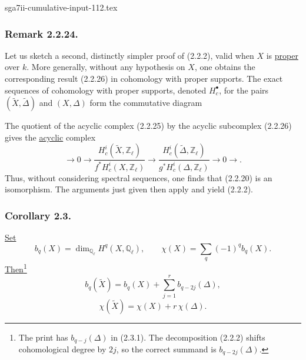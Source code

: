 \begin{filecontents*}{sga7ii-cumulative-input-112.tex}
\subsubsection*{Remark 2.2.24.}
Let us sketch a second, distinctly simpler proof of (2.2.2), valid when $X$
is \underline{proper} over $k$. More generally, without any hypothesis on
$X$, one obtains the corresponding result (2.2.26) in cohomology with proper
supports. The exact sequences of cohomology with proper supports, denoted
$H_c^\bullet$, for the pairs
$(\widetilde X,\widetilde\Delta)$ and $(X,\Delta)$ form the commutative
diagram
\begin{center}
\end{center}
The quotient of the acyclic complex (2.2.25) by the acyclic subcomplex
(2.2.26) gives the \underline{acyclic} complex
\begin{equation}\tag{2.2.27}
\longrightarrow 0\longrightarrow
\frac{H_c^i(\widetilde X,\mathbb Z_\ell)}
     {f^*H_c^i(X,\mathbb Z_\ell)}
\longrightarrow
\frac{H_c^i(\widetilde\Delta,\mathbb Z_\ell)}
     {g^*H_c^i(\Delta,\mathbb Z_\ell)}
\longrightarrow0\longrightarrow.
\end{equation}
Thus, without considering spectral sequences, one finds that (2.2.20) is an
isomorphism. The arguments just given then apply and yield (2.2.2).

\subsubsection*{Corollary 2.3.}
\underline{Set}
\[
b_q(X)=\dim_{\mathbb Q_\ell}H^q(X,\mathbb Q_\ell),
\qquad
\chi(X)=\sum_q(-1)^qb_q(X).
\]
\underline{Then}\footnote{The print has $b_{q-j}(\Delta)$ in (2.3.1).
The decomposition (2.2.2) shifts cohomological degree by $2j$, so the
correct summand is $b_{q-2j}(\Delta)$.}
\begin{equation}\tag{2.3.1}
b_q(\widetilde X)
=b_q(X)+\sum_{j=1}^{r}b_{q-2j}(\Delta),
\end{equation}
\begin{equation}\tag{2.3.2}
\chi(\widetilde X)=\chi(X)+r\,\chi(\Delta).
\end{equation}
\end{filecontents*}
